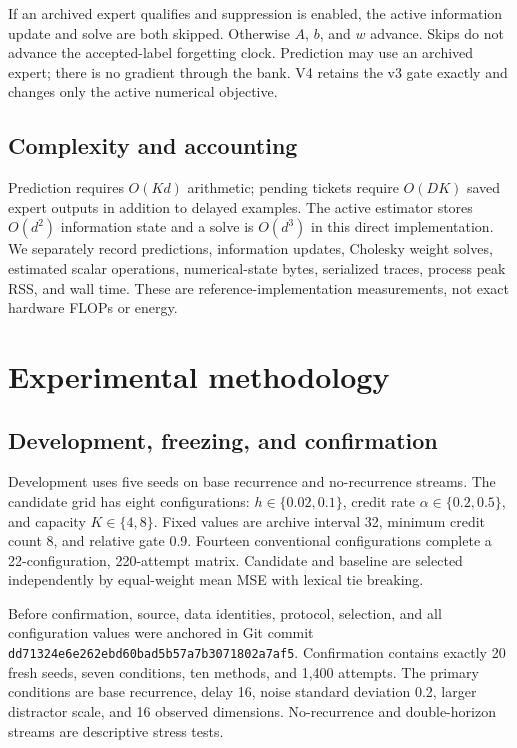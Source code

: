 \documentclass[10pt]{article}
\begin{document}
If an archived expert qualifies and suppression is enabled, the active information update and solve are both skipped. Otherwise $A$, $b$, and $w$ advance. Skips do not advance the accepted-label forgetting clock. Prediction may use an archived expert; there is no gradient through the bank. V4 retains the v3 gate exactly and changes only the active numerical objective.

\subsection{Complexity and accounting}
Prediction requires $O(Kd)$ arithmetic; pending tickets require $O(DK)$ saved expert outputs in addition to delayed examples. The active estimator stores $O(d^2)$ information state and a solve is $O(d^3)$ in this direct implementation. We separately record predictions, information updates, Cholesky weight solves, estimated scalar operations, numerical-state bytes, serialized traces, process peak RSS, and wall time. These are reference-implementation measurements, not exact hardware FLOPs or energy.

\section{Experimental methodology}
\subsection{Development, freezing, and confirmation}
Development uses five seeds on base recurrence and no-recurrence streams. The candidate grid has eight configurations: $h\in\{0.02,0.1\}$, credit rate $\alpha\in\{0.2,0.5\}$, and capacity $K\in\{4,8\}$. Fixed values are archive interval 32, minimum credit count 8, and relative gate 0.9. Fourteen conventional configurations complete a 22-configuration, 220-attempt matrix. Candidate and baseline are selected independently by equal-weight mean MSE with lexical tie breaking.

Before confirmation, source, data identities, protocol, selection, and all configuration values were anchored in Git commit \texttt{dd71324e6e262ebd60bad5b57a7b3071802a7af5}. Confirmation contains exactly 20 fresh seeds, seven conditions, ten methods, and 1,400 attempts. The primary conditions are base recurrence, delay 16, noise standard deviation 0.2, larger distractor scale, and 16 observed dimensions. No-recurrence and double-horizon streams are descriptive stress tests.
\end{document}
